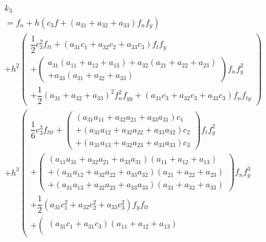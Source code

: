 \documentclass[a4paper,oneside]{book}
\numberwithin{equation}{chapter}
\begin{document}
\begin{align}
&{k_3} \\
&= {f_n} + h\left( {{c_3}f + \left( {{a_{31}} + {a_{32}} + {a_{33}}} \right){f_n}{f_y}} \right)\\
& + {h^2}\left( \begin{array}{l}
\dfrac{1}{2}c_3^2{f_{tt}} + \left( {{a_{31}}{c_1} + {a_{32}}{c_2} + {a_{33}}{c_3}} \right){f_t}{f_y}\\
 + \left( \begin{array}{l}
{a_{31}}\left( {{a_{11}} + {a_{12}} + {a_{13}}} \right) + {a_{32}}\left( {{a_{21}} + {a_{22}} + {a_{23}}} \right)\\
 + {a_{33}}\left( {{a_{31}} + {a_{32}} + {a_{33}}} \right)
\end{array} \right){f_n}f_y^2\\
 + \dfrac{1}{2}{\left( {{a_{31}} + {a_{32}} + {a_{33}}} \right)^2}f_n^2{f_{yy}} + \left( {{a_{31}}{c_3} + {a_{32}}{c_3} + {a_{33}}{c_3}} \right){f_n}{f_{ty}}
\end{array} \right)\\
& + {h^3}\left( \begin{array}{l}
\dfrac{1}{6}c_3^3{f_{ttt}} + \left( \begin{array}{l}
\left( {{a_{31}}{a_{11}} + {a_{32}}{a_{21}} + {a_{33}}{a_{31}}} \right){c_1}\\
 + \left( {{a_{31}}{a_{12}} + {a_{32}}{a_{22}} + {a_{33}}{a_{32}}} \right){c_2}\\
 + \left( {{a_{31}}{a_{13}} + {a_{32}}{a_{23}} + {a_{33}}{a_{33}}} \right){c_3}
\end{array} \right){f_t}f_y^2\\
+ \left( \begin{array}{l}
\left( {{a_{11}}{a_{31}} + {a_{32}}{a_{21}} + {a_{33}}{a_{31}}} \right)\left( {{a_{11}} + {a_{12}} + {a_{13}}} \right)\\
 + \left( {{a_{31}}{a_{12}} + {a_{32}}{a_{22}} + {a_{33}}{a_{32}}} \right)\left( {{a_{21}} + {a_{22}} + {a_{23}}} \right)\\
 + \left( {{a_{31}}{a_{13}} + {a_{32}}{a_{23}} + {a_{33}}{a_{33}}} \right)\left( {{a_{31}} + {a_{32}} + {a_{33}}} \right)
\end{array} \right){f_n}f_y^3\\
 + \dfrac{1}{2}\left( {{a_{31}}c_1^2 + {a_{32}}c_2^2 + {a_{33}}c_3^2} \right){f_y}{f_{tt}}\\
+ \left( \begin{array}{l}
\left( {{a_{31}}{c_1} + {a_{31}}{c_3}} \right)\left( {{a_{11}} + {a_{12}} + {a_{13}}} \right)\\

\end{array}
\end{array}
\end{align}
\end{document}

